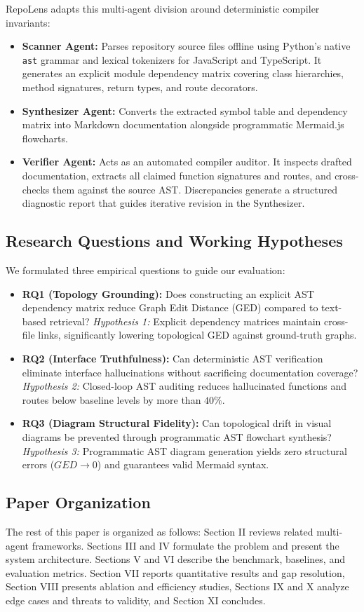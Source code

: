 \documentclass[conference]{IEEEtran}
\begin{document}
RepoLens adapts this multi-agent division around deterministic compiler invariants:
\begin{itemize}
    \item \textbf{Scanner Agent:} Parses repository source files offline using Python's native \texttt{ast} grammar and lexical tokenizers for JavaScript and TypeScript. It generates an explicit module dependency matrix covering class hierarchies, method signatures, return types, and route decorators.
    \item \textbf{Synthesizer Agent:} Converts the extracted symbol table and dependency matrix into Markdown documentation alongside programmatic Mermaid.js flowcharts.
    \item \textbf{Verifier Agent:} Acts as an automated compiler auditor. It inspects drafted documentation, extracts all claimed function signatures and routes, and cross-checks them against the source AST. Discrepancies generate a structured diagnostic report that guides iterative revision in the Synthesizer.
\end{itemize}

\subsection{Research Questions and Working Hypotheses}
We formulated three empirical questions to guide our evaluation:
\begin{itemize}
    \item \textbf{RQ1 (Topology Grounding):} Does constructing an explicit AST dependency matrix reduce Graph Edit Distance (GED) compared to text-based retrieval? \textit{Hypothesis 1:} Explicit dependency matrices maintain cross-file links, significantly lowering topological GED against ground-truth graphs.
    \item \textbf{RQ2 (Interface Truthfulness):} Can deterministic AST verification eliminate interface hallucinations without sacrificing documentation coverage? \textit{Hypothesis 2:} Closed-loop AST auditing reduces hallucinated functions and routes below baseline levels by more than $40\%$.
    \item \textbf{RQ3 (Diagram Structural Fidelity):} Can topological drift in visual diagrams be prevented through programmatic AST flowchart synthesis? \textit{Hypothesis 3:} Programmatic AST diagram generation yields zero structural errors ($GED \to 0$) and guarantees valid Mermaid syntax.
\end{itemize}

\subsection{Paper Organization}
The rest of this paper is organized as follows: Section II reviews related multi-agent frameworks. Sections III and IV formulate the problem and present the system architecture. Sections V and VI describe the benchmark, baselines, and evaluation metrics. Section VII reports quantitative results and gap resolution, Section VIII presents ablation and efficiency studies, Sections IX and X analyze edge cases and threats to validity, and Section XI concludes.
\end{document}
